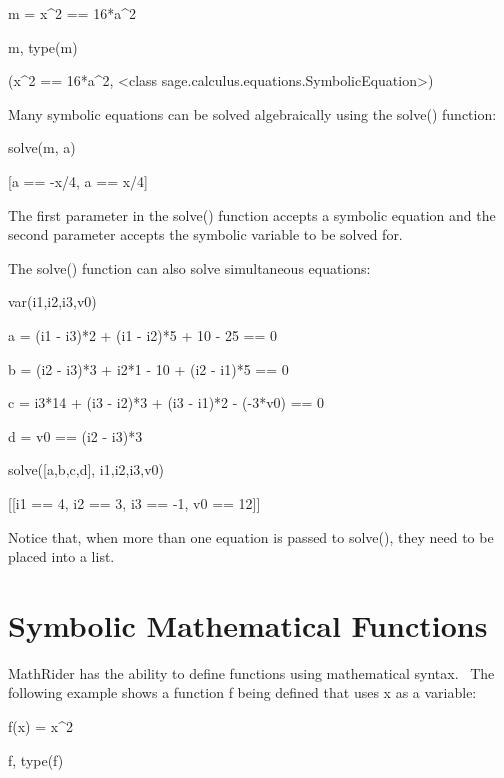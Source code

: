 \documentclass[12pt,twoside]{book}
\begin{document}
\bigskip

m = x\^{}2 == 16*a\^{}2

m, type(m)

{\textbar}

(x\^{}2 == 16*a\^{}2, {\textless}class
{\textquotesingle}sage.calculus.equations.SymbolicEquation{\textquotesingle}{\textgreater})

Many symbolic equations can be solved algebraically using the solve()
function:


\bigskip

solve(m, a)

{\textbar}

[a == {}-x/4, a == x/4]

The first parameter in the solve() function accepts a symbolic equation
and the second parameter accepts the symbolic variable to be solved
for.


\bigskip

The solve() function can also solve simultaneous equations:


\bigskip

var({\textquotesingle}i1,i2,i3,v0{\textquotesingle})


\bigskip

a = (i1 {}- i3)*2 + (i1 {}- i2)*5 + 10 {}- 25 == 0

b = (i2 {}- i3)*3 + i2*1 {}- 10 + (i2 {}- i1)*5 == 0

c = i3*14 + (i3 {}- i2)*3 + (i3 {}- i1)*2 {}- ({}-3*v0) == 0

d = v0 == (i2 {}- i3)*3


\bigskip

solve([a,b,c,d], i1,i2,i3,v0)

{\textbar}

[[i1 == 4, i2 == 3, i3 == {}-1, v0 == 12]]

Notice that, when more than one equation is passed to solve(), they need
to be placed into a list.

\section[Symbolic Mathematical Functions]{
Symbolic Mathematical Functions}

MathRider has the ability to define functions using mathematical syntax.
\ The following example shows a function f being defined that uses x as
a variable:


\bigskip

f(x) = x\^{}2

f, type(f)
\end{document}
